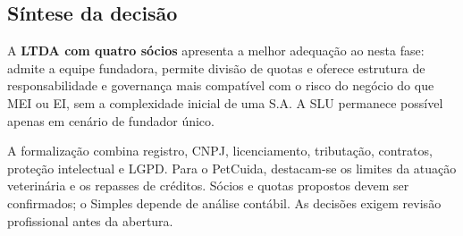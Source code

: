 \subsection{Síntese da decisão}
A \textbf{LTDA com quatro sócios} apresenta a melhor adequação ao \projeto{} nesta fase: admite a equipe fundadora, permite divisão de quotas e oferece estrutura de responsabilidade e governança mais compatível com o risco do negócio do que MEI ou EI, sem a complexidade inicial de uma S.A. A SLU permanece possível apenas em cenário de fundador único.

A formalização combina registro, CNPJ, licenciamento, tributação, contratos, proteção intelectual e LGPD. Para o PetCuida, destacam-se os limites da atuação veterinária e os repasses de créditos. Sócios e quotas propostos devem ser confirmados; o Simples depende de análise contábil. As decisões exigem revisão profissional antes da abertura.